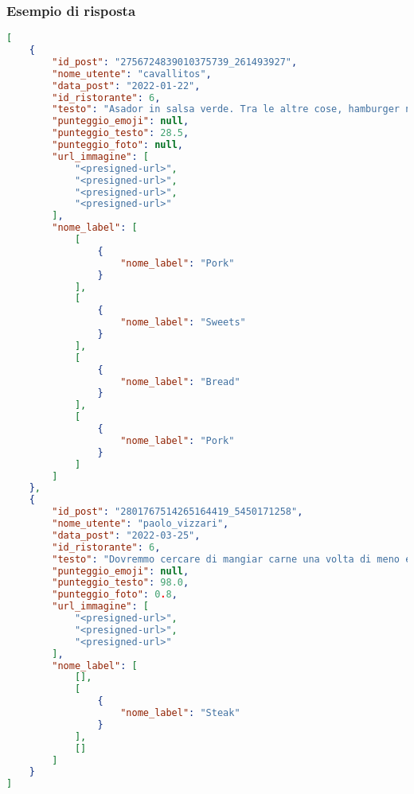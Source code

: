 \subsubsection{Esempio di risposta}
\begin{lstlisting}[language=json]
[
    {
        "id_post": "2756724839010375739_261493927",
        "nome_utente": "cavallitos",
        "data_post": "2022-01-22",
        "id_ristorante": 6,
        "testo": "Asador in salsa verde. Tra le altre cose, hamburger nippo-piemontese di wagyu e vicciola.",
        "punteggio_emoji": null,
        "punteggio_testo": 28.5,
        "punteggio_foto": null,
        "url_immagine": [
            "<presigned-url>",
            "<presigned-url>",
            "<presigned-url>",
            "<presigned-url>"
        ],
        "nome_label": [
            [
                {
                    "nome_label": "Pork"
                }
            ],
            [
                {
                    "nome_label": "Sweets"
                }
            ],
            [
                {
                    "nome_label": "Bread"
                }
            ],
            [
                {
                    "nome_label": "Pork"
                }
            ]
        ]
    },
    {
        "id_post": "2801767514265164419_5450171258",
        "nome_utente": "paolo_vizzari",
        "data_post": "2022-03-25",
        "id_ristorante": 6,
        "testo": "Dovremmo cercare di mangiar carne una volta di meno e mangiarla dieci volte meglio. \n \n Roberto e' il mio personale sacerdote della bistecca, l'unico capace di emozionarmi tre volte per ogni ciccia: quando la racconta, mentre la cuoce e colpo finale al morso. Un sardone trapiantato a Torino col cuore grande come le sue costate e prezioso come le sue  frollature perfette.\n\nCi vuol poco a bruciare una poesia, molto piu' amore per scriverne i versi con la brace.",
        "punteggio_emoji": null,
        "punteggio_testo": 98.0,
        "punteggio_foto": 0.8,
        "url_immagine": [
            "<presigned-url>",
            "<presigned-url>",
            "<presigned-url>"
        ],
        "nome_label": [
            [],
            [
                {
                    "nome_label": "Steak"
                }
            ],
            []
        ]
    }
]

\end{lstlisting}

\pagebreak








